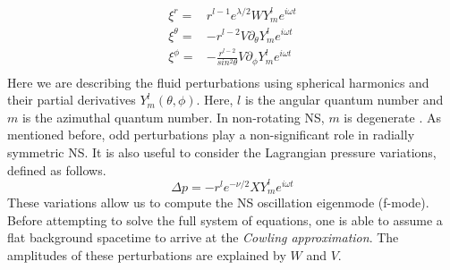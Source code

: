 \documentclass[aps,prd,twocolumn,superscriptaddress,footinbib]{revtex4-1}
\begin{document}
\begin{align} %
   \xi^{r} = &  r^{l-1}e^{\lambda/2} W Y^l_m e^{i \omega t} \\
   \xi^{\theta} = & -r^{l-2} V \partial_{\theta} Y^l_m e^{i \omega t} \\
   \xi^{\phi} = & -\frac{r^{l-2}}{sin^2{\theta}}V\partial_{\phi}Y^l_m e^{i \omega t} \\
\end{align}
Here we are describing the fluid perturbations using spherical harmonics and their partial derivatives $Y^l_m(\theta, \phi)$. Here, $l$ is the angular quantum number and $m$ is the azimuthal quantum number. In non-rotating NS, $m$ is degenerate \cite{2205}. As mentioned before, odd perturbations play a non-significant role in radially symmetric NS. It is also useful to consider the Lagrangian pressure variations, defined as follows. 
\begin{equation}
    \Delta p = -r^l e^{-\nu/2}X Y^{l}_m e^{i \omega t}
\end{equation}
These variations allow us to compute the NS oscillation eigenmode (f-mode). Before attempting to solve the full system of equations, one is able to assume a flat background spacetime to arrive at the \textit{Cowling approximation}. The amplitudes of these perturbations are explained by $W$ and $V$. 
\end{document}

